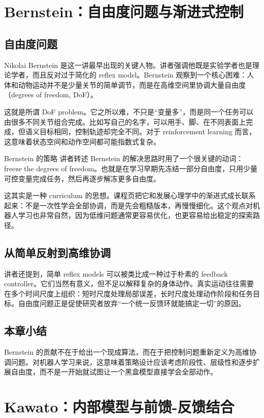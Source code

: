 \documentclass[a4paper]{article}
\begin{document}
\section{Bernstein：自由度问题与渐进式控制}
\subsection{自由度问题}
Nikolai Bernstein 是这一讲最早出现的关键人物。讲者强调他既是实验学者也是理论学者，而且反对过于简化的 reflex model。Bernstein 观察到一个核心困难：人体和动物运动并不是少量关节的简单调节，而是在高维空间里协调大量自由度（degrees of freedom, DoF）。

这就是所谓 DoF problem。它之所以难，不只是“变量多”，而是同一个任务可以由很多不同关节组合完成。比如写自己的名字，可以用手、脚、在不同表面上完成，但语义目标相同，控制轨迹却完全不同。对于 reinforcement learning 而言，这意味着状态空间和动作空间都可能指数式复杂。

\begin{importantbox}{Bernstein 的策略}
讲者转述 Bernstein 的解决思路时用了一个很关键的动词：freeze the degrees of freedom。也就是在学习早期先冻结一部分自由度，只用少量可控变量完成任务，然后再逐步解冻更多自由度。
\end{importantbox}

这其实是一种 curriculum 的思想。课程页把它和发展心理学中的渐进式成长联系起来：不是一次性学会全部协调，而是先会粗糙版本，再慢慢细化。这个观点对机器人学习也非常自然，因为低维问题通常更容易优化，也更容易给出稳定的探索路径。

\subsection{从简单反射到高维协调}
讲者还提到，简单 reflex models 可以被类比成一种过于朴素的 feedback controller。它们当然有意义，但不足以解释复杂的身体动作。真实运动往往需要在多个时间尺度上组织：短时尺度处理局部误差，长时尺度处理动作阶段和任务目标。自由度问题正是促使研究者放弃“一个统一反馈环就能搞定一切”的原因。

\subsection{本章小结}
Bernstein 的贡献不在于给出一个现成算法，而在于把控制问题重新定义为高维协调问题。对机器人学习来说，这意味着策略设计应该考虑阶段性、层级性和逐步扩展自由度，而不是一开始就试图让一个黑盒模型直接学会全部动作。

\section{Kawato：内部模型与前馈-反馈结合}
\end{document}
